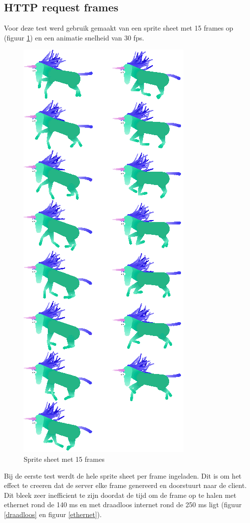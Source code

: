 \subsection{HTTP request frames}

Voor deze test werd gebruik gemaakt van een sprite sheet met 15 frames op (figuur \ref{sheet}) en een animatie snelheid van 30 fps.

\begin{figure}[H]
\centering
\includegraphics[scale=0.7]{img/charging.png}
\caption{Sprite sheet met 15 frames} \label{sheet}
\end{figure}

Bij de eerste test werdt de hele sprite sheet per frame ingeladen. Dit is om het effect te creeren dat de server elke frame genereerd en doorstuurt naar de client. Dit bleek zeer inefficient te zijn doordat de tijd om de frame op te halen met ethernet rond de 140 ms en met draadloos internet rond de 250 ms ligt (figuur \ref{draadloos} en figuur \ref{ethernet}).

